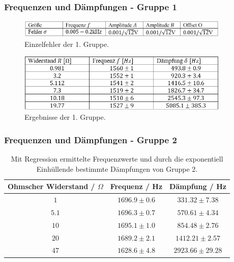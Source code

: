 \documentclass{beamer}
\begin{document}
\begin{frame}
\frametitle{Frequenzen und Dämpfungen - Gruppe 1}
\begin{figure}
\centering
\includegraphics[width=0.9\textwidth]{abbildungen/1VFehler.PNG}
\caption{Einzelfehler der 1. Gruppe.}
\end{figure}

\begin{figure}
\centering
\includegraphics[width=0.9\textwidth]{abbildungen/1VWerte.PNG}
\caption{Ergebnisse der 1. Gruppe.}
\end{figure}
\end{frame}

\begin{frame}
\frametitle{Frequenzen und Dämpfungen - Gruppe 2}
\begin{table}
\centering
\begin{tabular}{c|c|c}
Ohmscher Widerstand / $\Omega$ & Frequenz / Hz & Dämpfung / Hz \\
\hline
$1$ & $1696.9 \pm 0.6$ & $331.32\pm 7.38$ \\
$5.1$ & $1696.3 \pm 0.7$ & $570.61\pm 4.34$ \\
$10$ & $1695.1 \pm 1.0$ & $854.48\pm 2.76$ \\
$20$ & $1689.2 \pm 2.1$ & $1412.21\pm 2.57$  \\
$47$ & $1628.6 \pm 4.8$ & $2923.66\pm 29.28$
\end{tabular}
\caption{Mit Regression ermittelte Frequenzwerte und durch die exponentiell Einhüllende bestimmte Dämpfungen von Gruppe 2.}
\end{table}
\end{frame}

\end{document}
